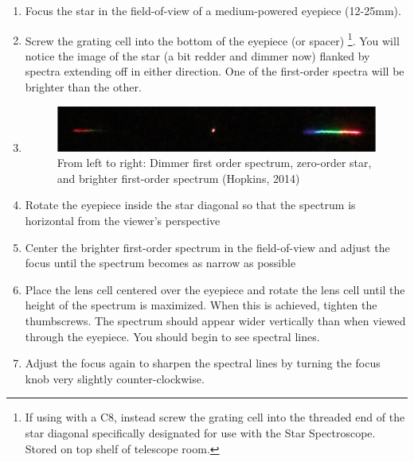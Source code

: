 \documentclass[12pt,titlepage]{article}
\begin{document}
\begin{enumerate}
	\item Focus the star in the field-of-view of a medium-powered eyepiece (12-25mm).
	\item Screw the grating cell into the bottom of the eyepiece (or spacer)
			\footnote[*]{If using with a C8, instead screw the grating cell into the threaded end of the star
					diagonal specifically designated for use with the Star Spectroscope.
					Stored on top shelf of telescope room.}.
			You will notice the image of the star (a bit redder and dimmer now) flanked by spectra
			extending off in either direction.
			One of the first-order spectra will be brighter than the other.
	\item[] \begin{figure}[H]
				\begin{center}
					\includegraphics[width=.8\textwidth]{./images/rbw_optics/zero_and_first_order.png}
					\caption{From left to right: Dimmer first order spectrum, zero-order star, and 
							brighter first-order spectrum (Hopkins, 2014\cite{hopkins_spec})}
				\end{center}	
			\end{figure}
	\item Rotate the eyepiece inside the star diagonal so that the spectrum is horizontal from the viewer's perspective
	\item Center the brighter first-order spectrum in the field-of-view and adjust the focus until the spectrum becomes
			as narrow as possible
	\item Place the lens cell centered over the eyepiece and rotate the lens cell until the height of the spectrum is maximized.
			When this is achieved, tighten the thumbscrews.
			The spectrum should appear wider vertically than when viewed through the eyepiece.
			You should begin to see spectral lines.
	\item Adjust the focus again to sharpen the spectral lines by turning the focus knob very slightly counter-clockwise.
\end{enumerate}
\end{document}
